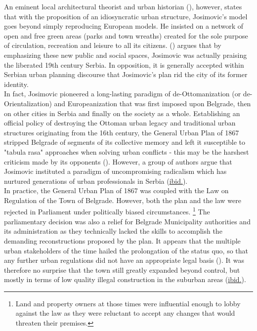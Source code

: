\documentclass[11pt]{report}
\begin{document}
{{{{An eminent local architectural theorist and urban historian (\href{Blagojevic}{\citealt{blagojevic_urban_2009}}), however, states that with the proposition of an idiosyncratic urban structure, Josimovic's model goes beyond simply reproducing European models.
He insisted on a network of open and free green areas (parks and town wreaths) created for the sole purpose of circulation, recreation and leisure to all its citizens. (\href{Blagojevic}{\citealt{blagojevic_urban_2009}}) argues that by emphasizing these new public and social spaces, Josimovic was actually praising the liberated 19th century Serbia. In opposition, it is generally accepted within Serbian urban planning discourse that Josimovic’s plan rid the city of its former identity.
\\

In fact,  Josimovic pioneered a long-lasting paradigm of de-Ottomanization (or de-Orientalization) and Europeanization that was first imposed upon Belgrade, then on other cities in Serbia and finally on the society as a whole. Establishing an official policy of destroying the Ottoman urban legacy and traditional urban structures originating from the 16th century, the General Urban Plan of 1867 stripped Belgrade of segments of its collective memory and left it susceptible to "tabula rasa" approaches when solving urban conflicts - this may be the harshest criticism made by its opponents  (\href{Doytchinov}{\citealt{doytchinov_modernization_2015}}).
However, a group of authors argue that Josimovic instituted a paradigm of uncompromising radicalism which has nurtured generations of urban professionals in Serbia (\href{ref}{ibid.}).
\\

In  practice,  the General  Urban  Plan  of  1867  was  coupled  with  the  Law  on  Regulation  of the  Town  of  Belgrade.    However,  both  the  plan  and  the  law  were  rejected  in  Parliament under politically biased circumstances.
\footnote{Land and property owners at those times were influential enough to lobby against the law as they were reluctant to accept any changes that would threaten their premises.}
The parliamentary decision was also a relief for Belgrade Municipality authorities and its administration as they technically lacked the skills to accomplish the demanding reconstructions proposed by the plan. It appears that the multiple urban stakeholders of the time hailed the prolongation of the status quo, so that any further urban regulations did not have an appropriate legal basis (\href{Doytchinov}{\citealt{doytchinov_modernization_2015}}). It was therefore no surprise that the town still greatly expanded beyond control, but mostly in terms of low quality illegal construction in the suburban areas (\href{ref}{ibid.}).
\\

}}}}
\end{document}
